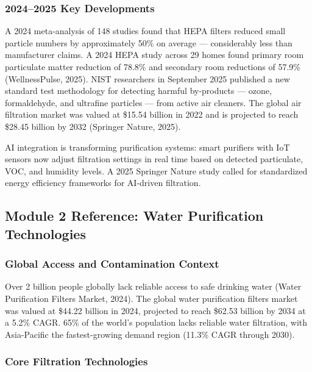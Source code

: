 \documentclass[11pt,letterpaper]{article}
\begin{document}
\subsubsection{2024--2025 Key Developments}

A 2024 meta-analysis of 148 studies found that HEPA filters reduced small particle numbers by approximately 50\% on average --- considerably less than manufacturer claims. A 2024 HEPA study across 29 homes found primary room particulate matter reduction of 78.8\% and secondary room reductions of 57.9\% (WellnessPulse, 2025). NIST researchers in September 2025 published a new standard test methodology for detecting harmful by-products --- ozone, formaldehyde, and ultrafine particles --- from active air cleaners. The global air filtration market was valued at \$15.54 billion in 2022 and is projected to reach \$28.45 billion by 2032 (Springer Nature, 2025).

AI integration is transforming purification systems: smart purifiers with IoT sensors now adjust filtration settings in real time based on detected particulate, VOC, and humidity levels. A 2025 Springer Nature study called for standardized energy efficiency frameworks for AI-driven filtration.

\subsection{Module 2 Reference: Water Purification Technologies}

\subsubsection{Global Access and Contamination Context}

Over 2 billion people globally lack reliable access to safe drinking water (Water Purification Filters Market, 2024). The global water purification filters market was valued at \$44.22 billion in 2024, projected to reach \$62.53 billion by 2034 at a 5.2\% CAGR. 65\% of the world's population lacks reliable water filtration, with Asia-Pacific the fastest-growing demand region (11.3\% CAGR through 2030).

\subsubsection{Core Filtration Technologies}
\end{document}
